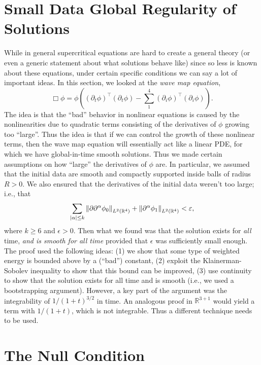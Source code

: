 \documentclass{article}
\begin{document}
	
	\section{Small Data Global Regularity of Solutions} 
	While in general supercritical equations are hard to create a general theory (or even a generic statement about what solutions behave like) since so less is known about these equations, under certain specific conditions we can say a lot of important ideas. In this section, we looked at the \textit{wave map equation}, 
	\begin{equation*}
		\Box\phi = \phi\left((\partial_{t}\phi)^{\top}(\partial_{t}\phi) - \sum_{1}^{4}(\partial_{i}\phi)^{\top}(\partial_{i}\phi)\right). 
	\end{equation*} 
	The idea is that the ``bad'' behavior in nonlinear equations is caused by the nonlinearities due to quadratic terms consisting of the derivatives of $\phi$ growing too ``large''. Thus the idea is that if we can control the growth of these nonlinear terms, then the wave map equation will essentially act like a linear PDE, for which we have global-in-time smooth solutions. Thus we made certain assumptions on how ``large'' the derivatives of $\phi$ are. In particular, we assumed that the initial data are smooth and compactly supported inside balls of radius $R > 0$. We also ensured that the derivatives of the initial data weren't too large; i.e., that 
	\begin{equation*}
		\sum_{|\alpha|\leq k}\left\Vert \partial\partial^{\alpha}\phi_{0} \right\Vert_{L^{2}(\mathbb{R}^{4})} + \left\Vert \partial^{\alpha}\phi_{1} \right\Vert_{L^{2}(\mathbb{R}^{4})} < \varepsilon, 
	\end{equation*} 
	where $k \geq 6$ and $\epsilon > 0$. Then what we found was that the solution exists for \textit{all} time, \textit{and is smooth for all time} provided that $\epsilon$ was sufficiently small enough. The proof used the following ideas: (1) we show that some type of weighted energy is bounded above by a (``bad'') constant, (2) exploit the Klainerman-Sobolev inequality to show that this bound can be improved, (3) use continuity to show that the solution exists for all time and is smooth (i.e., we used a bootstrapping argument). However, a key part of the argument was the integrability of $1/(1 + t)^{3/2}$ in time. An analogous proof in $\mathbb{R}^{3 + 1}$ would yield a term with $1/(1 + t)$, which is not integrable. Thus a different technique needs to be used. 
	
	\section{The Null Condition} 
	
\end{document}
